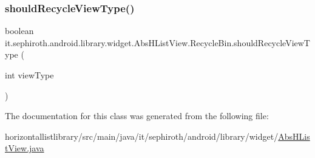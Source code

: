 \subsubsection{\texorpdfstring{should\+Recycle\+View\+Type()}{shouldRecycleViewType()}}
{\footnotesize\ttfamily boolean it.\+sephiroth.\+android.\+library.\+widget.\+Abs\+H\+List\+View.\+Recycle\+Bin.\+should\+Recycle\+View\+Type (\begin{DoxyParamCaption}\item[{int}]{view\+Type }\end{DoxyParamCaption})}



The documentation for this class was generated from the following file\+:\begin{DoxyCompactItemize}
\item 
horizontallistlibrary/src/main/java/it/sephiroth/android/library/widget/\hyperlink{_abs_h_list_view_8java}{Abs\+H\+List\+View.\+java}\end{DoxyCompactItemize}
